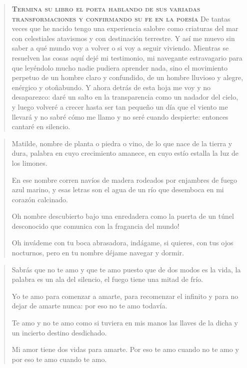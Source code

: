 \documentclass[12pt]{article}
\begin{document}
\begin{verse}
\vspace{\baselineskip}
{\scshape\bfseries Termina su libro el poeta hablando de sus variadas transformaciones y confirmando su fe en la poesía}
De tantas veces que he nacido  
tengo una experiencia salobre  
como criaturas del mar  
con celestiales atavismos  
y con destinación terrestre.  
Y así me muevo sin saber  
a qué mundo voy a volver  
o si voy a seguir viviendo.  
Mientras se resuelven las cosas  
aquí dejé mi testimonio,  
mi navegante estravagario  
para que leyéndolo mucho  
nadie pudiera aprender nada,  
sino el movimiento perpetuo  
de un hombre claro y confundido,  
de un hombre lluvioso y alegre,  
enérgico y otoñabundo.  
Y ahora detrás de esta hoja  
me voy y no desaparezco:  
daré un salto en la transparencia  
como un nadador del cielo,  
y luego volveré a crecer  
hasta ser tan pequeño un día  
que el viento me llevará  
y no sabré cómo me llamo  
y no seré cuando despierte:  
entonces cantaré en silencio.  

\end{verse}

\clearpage
{}
\begin{verse}
Matilde, nombre de planta o piedra o vino,  
de lo que nace de la tierra y dura,  
palabra en cuyo crecimiento amanece,  
en cuyo estío estalla la luz de los limones.  

En ese nombre corren navíos de madera  
rodeados por enjambres de fuego azul marino,  
y esas letras son el agua de un río  
que desemboca en mi corazón calcinado.  

Oh nombre descubierto bajo una enredadera  
como la puerta de un túnel desconocido  
que comunica con la fragancia del mundo!  

Oh invádeme con tu boca abrasadora,  
indágame, si quieres, con tus ojos nocturnos,  
pero en tu nombre déjame navegar y dormir.  

\end{verse}

\clearpage
{}
\begin{verse}
Sabrás que no te amo y que te amo  
puesto que de dos modos es la vida,  
la palabra es un ala del silencio,  
el fuego tiene una mitad de frío.  

Yo te amo para comenzar a amarte,  
para recomenzar el infinito  
y para no dejar de amarte nunca:  
por eso no te amo todavía.  

Te amo y no te amo como si tuviera  
en mis manos las llaves de la dicha  
y un incierto destino desdichado.  

Mi amor tiene dos vidas para amarte.  
Por eso te amo cuando no te amo  
y por eso te amo cuando te amo.  

\end{verse}
\end{document}
